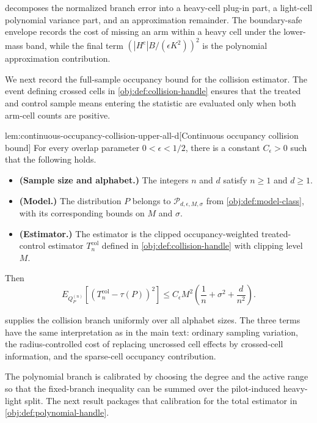  decomposes the normalized branch error into a heavy-cell plug-in part, a light-cell polynomial variance part, and an approximation remainder. The boundary-safe envelope records the cost of missing an arm within a heavy cell under the lower-mass band, while the final term \((|H^{\mathrm c}|B/(\epsilon K^2))^2\) is the polynomial approximation contribution.

We next record the full-sample occupancy bound for the collision estimator. The event defining crossed cells in \cref{obj:def:collision-handle} ensures that the treated and control sample means entering the statistic are evaluated only when both arm-cell counts are positive.

\begin{lemmav}{lem:continuous-occupancy-collision-upper-all-d}[Continuous occupancy collision bound]
For every overlap parameter \(0<\epsilon<1/2\), there is a constant \(C_{\epsilon}>0\) such that the following holds.
\begin{itemize}
\item \textbf{(Sample size and alphabet.)} The integers \(n\) and \(d\) satisfy \(n\ge 1\) and \(d\ge 1\).
\item \textbf{(Model.)} The distribution \(P\) belongs to \(\mathcal P_{d,\epsilon,M,\sigma}\) from \cref{obj:def:model-class}, with its corresponding bounds on \(M\) and \(\sigma\).
\item \textbf{(Estimator.)} The estimator is the clipped occupancy-weighted treated-control estimator \(T_n^{\mathrm{col}}\) defined in \cref{obj:def:collision-handle} with clipping level \(M\).
\end{itemize}
Then
\[
  E_{Q_P^{(n)}}\!\left[\left(T_n^{\mathrm{col}}-\tau(P)\right)^2\right]
  \le
  C_{\epsilon}M^2
  \left(
    \frac{1}{n}
    +\sigma^2
    +\frac{d}{n^2}
  \right).
\]
\end{lemmav}

 supplies the collision branch uniformly over all alphabet sizes. The three terms have the same interpretation as in the main text: ordinary sampling variation, the radius-controlled cost of replacing uncrossed cell effects by crossed-cell information, and the sparse-cell occupancy contribution.

The polynomial branch is calibrated by choosing the degree and the active range so that the fixed-branch inequality can be summed over the pilot-induced heavy-light split. The next result packages that calibration for the total estimator in \cref{obj:def:polynomial-handle}.

